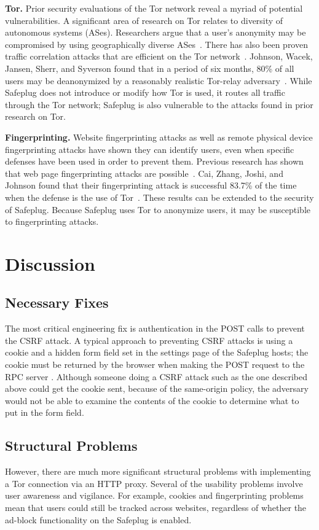 \documentclass[letterpaper,twocolumn,10pt]{article}
\begin{document}
{\bf Tor.} Prior security evaluations of the Tor network reveal a myriad of potential vulnerabilities.  A significant area of research on Tor relates to diversity of autonomous systems (ASes).  Researchers argue that a user's anonymity may be compromised by using geographically diverse ASes~\cite{feamster, murdoch2}.  There has also been proven traffic correlation attacks that are efficient on the Tor network~\cite{murdoch, overlier}.  Johnson, Wacek, Jansen, Sherr, and Syverson found that in a period of six months, 80\% of all users may be deanonymized by a reasonably realistic Tor-relay adversary~\cite{tor2}.  While Safeplug does not introduce or modify how Tor is used, it routes all traffic through the Tor network; Safeplug is also vulnerable to the attacks found in prior research on Tor.  

{\bf Fingerprinting.}  Website fingerprinting attacks as well as remote physical device fingerprinting attacks have shown they can identify users, even when specific defenses have been used in order to prevent them. Previous research has shown that web page fingerprinting attacks are possible~\cite{dyer, herrmann, panchenko}.  Cai, Zhang, Joshi, and Johnson found that their fingerprinting attack is successful 83.7\% of the time when the defense is the use of Tor~\cite{fingerprint1}.  These results can be extended to the security of Safeplug.  Because Safeplug uses Tor to anonymize users, it may be susceptible to fingerprinting attacks.

\section{Discussion}
\subsection{Necessary Fixes}
The most critical engineering fix is authentication in the POST calls to prevent the CSRF attack.  A typical approach to preventing CSRF attacks is using a cookie and a hidden form field set in the settings page of the Safeplug hosts; the cookie must be returned by the browser when making the POST request to the RPC server \cite{csrfdef}.  Although someone doing a CSRF attack such as the one described above could get the cookie sent, because of the same-origin policy, the adversary would not be able to examine the contents of the cookie to determine what to put in the form field.

\subsection{Structural Problems}
However, there are much more significant structural problems with implementing a Tor connection via an HTTP proxy.  Several of the usability problems involve user awareness and vigilance.  For example, cookies and fingerprinting problems mean that users could still be tracked across websites, regardless of whether the ad-block functionality on the Safeplug is enabled.  
\end{document}

